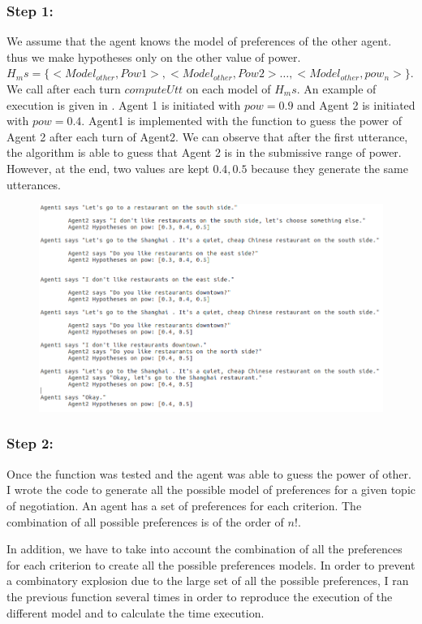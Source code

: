 \documentclass{llncs}
\begin{document}
	\subsubsection{Step 1:} We assume that the agent knows the model of preferences of the other agent. thus we make hypotheses only on the other value of power. 
	$H_ms= \{<Model_{other}, Pow1>, <Model_{other}, Pow2>\ldots, <Model_{other}, pow_n> \}$.
	We call after each turn $computeUtt$ on each model of $H_ms$. An example of execution is given in . Agent 1 is initiated with $pow =0.9$ and Agent 2 is initiated with $pow =0.4$. Agent1 is implemented with the function to guess the power of Agent 2 after each turn of Agent2.
	We can observe that after the first utterance, the algorithm is able to guess that Agent 2 is in the submissive range of power. However, at the end, two values are kept $0.4,0.5$ because they generate the same utterances.
	 \begin{figure} [h]
	 	\centerline{\includegraphics[width=5in]{figs/ex.png}}
	 	\vskip 8pt
	 \end{figure}
	 
	
	\subsubsection{Step 2:} Once the function was tested and the agent was able to guess the power of other. I wrote the code to generate all the possible model of preferences for a given topic of negotiation. An agent has a set of preferences for each criterion. The combination of all possible preferences is of the order of $n!$. 
	
	In addition, we have to take into account the combination of all the preferences for each criterion to create all the possible preferences models.
	In order to prevent a combinatory explosion due to the large set of all the possible preferences, I ran the previous function several times in order to reproduce the execution of the different model and to calculate the time execution.  
\end{document}
